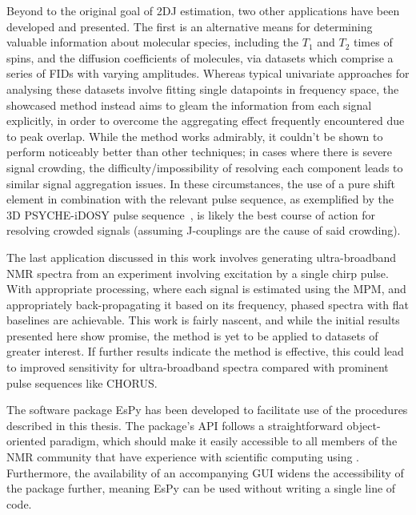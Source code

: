 Beyond to the original goal of \ac{2DJ} estimation, two other applications
have been developed and presented. The first is an alternative means for
determining valuable information about molecular species, including the $T_1$
and $T_2$ times of spins, and the diffusion coefficients of molecules, via
datasets which comprise a series of \acp{FID} with varying amplitudes. Whereas
typical univariate
approaches for analysing these datasets involve fitting single datapoints in
frequency space, the showcased method instead aims to gleam the
information from each signal explicitly, in order to overcome the aggregating
effect frequently encountered due to peak overlap. While the method works
admirably,
it couldn't be shown to perform noticeably better than other techniques; in
cases where there is severe signal crowding, the difficulty/impossibility of
resolving each component leads to similar signal aggregation issues.
In these circumstances, the use of a pure shift element in
combination with the relevant pulse sequence, as exemplified by the
\ac{3D} \ac{PSYCHE}-i\ac{DOSY} pulse sequence~\cite{Foroozandeh2016}, is likely
the best course of action for resolving crowded signals (assuming J-couplings
are the cause of said crowding).

The last application discussed in this work involves generating ultra-broadband
\ac{NMR} spectra from an experiment involving excitation by a single chirp
pulse. With appropriate processing, where each signal is estimated using the
\ac{MPM}, and appropriately back-propagating it based on its frequency, phased
spectra with flat baselines are achievable.
This work is fairly nascent, and while the initial results presented here show
promise, the method is yet to be applied to datasets of greater interest. If
further results indicate the method is effective, this could lead to improved
sensitivity for ultra-broadband spectra compared with prominent pulse sequences
like \ac{CHORUS}.

The software package \ac{EsPy} has been developed to facilitate use of the
procedures described in this thesis. The package's \ac{API} follows a
straightforward object-oriented paradigm, which should make it easily
accessible to all members of the \ac{NMR} community that have experience with
scientific computing using \Python\!. Furthermore, the availability of an
accompanying \ac{GUI} widens the accessibility of the package further, meaning
\ac{EsPy} can be used without writing a single line of code.

